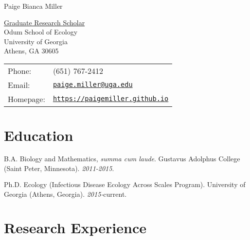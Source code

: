 \documentclass[letterpaper]{article}
\def\name{Paige Bianca Miller}
\renewenvironment{itemize}{
  \begin{list}{}{
    \setlength{\leftmargin}{1.5em}
  }
}{
  \end{list}
}
\begin{document}
{\huge \name}


\vspace{0.25in}

\begin{minipage}{0.45\linewidth}
  \href{}{Graduate Research Scholar} \\
  Odum School of Ecology \\
  University of Georgia \\
  Athens, GA 30605
\end{minipage}
\begin{minipage}{0.45\linewidth}
  \begin{tabular}{ll}
    Phone: & (651) 767-2412 \\
    Email: & \href{mailto:paige.miller@uga.edu}{\tt paige.miller@uga.edu} \\
    Homepage: & \href{https://paigemiller.github.io}{\tt https://paigemiller.github.io} \\
  \end{tabular}
\end{minipage}

\section*{Education}

\begin{itemize}
  \item B.A. Biology and Mathematics, \textit{summa cum laude}. Gustavus Adolphus College (Saint Peter, Minnesota). \textit{2011-2015}.

  \item Ph.D. Ecology (Infectious Disease Ecology Across Scales Program). University of Georgia (Athens, Georgia). \textit{2015-}current.
\end{itemize}

\section*{Research Experience}
\end{document}
